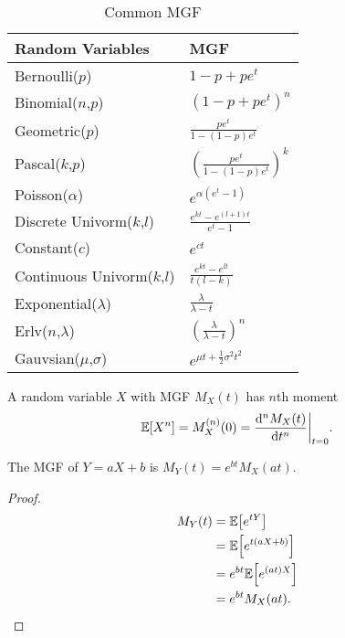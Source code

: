 \begin{table}[H]
    \centering
    \renewcommand{\arraystretch}{2}
    \begin{tabular}{|l|l|}
    \hline
    Random Variables            & MGF                                               \\ \hline
    Bernoulli($p$)              & $1-p+pe^t$                                 \\ \hline
    Binomial($n$,$p$)           & $(1-p+pe^t)^n$                             \\ \hline
    Geometric($p$)              & $\frac{pe^t}{1-(1-p)e^t}$                  \\ \hline
    Pascal($k$,$p$)             & $\left(\frac{pe^t}{1-(1-p)e^t}\right)^k$   \\ \hline
    Poisson($\alpha$)           & $e^{\alpha(e^t-1)}$                        \\ \hline
    Discrete Univorm($k$,$l$)   & $\frac{e^{kt}-e^{(l+1)t}}{e^t-1}$          \\ \hline
    Constant($c$)               & $e^{ct}$                                   \\ \hline
    Continuous Univorm($k$,$l$) & $\frac{e^{kt}-e^{lt}}{t(l-k)}$             \\ \hline
    Exponential($\lambda$)      & $\frac{\lambda}{\lambda-t}$                \\ \hline
    Erlv($n$,$\lambda$)       & $\left(\frac{\lambda}{\lambda-t}\right)^n$ \\ \hline
    Gauvsian($\mu$,$\sigma$)    & $e^{\mu t+\frac{1}{2}\sigma^2t^2}$         \\ \hline
    \end{tabular}
    \caption{Common MGF}
\end{table}

\begin{theorem}
    A random variable $X$ with \textnormal{MGF} $M_X(t)$ has $n$th moment
    \[\E{X^n}=M_X^{(n)}(0)=\frac{\diff^n M_X(t)}{\diff t^n}\bigg\rvert_{t=0}.\]
\end{theorem}

\begin{theorem}
    The \textnormal{MGF} of $Y=aX+b$ is $M_Y(t)=e^{bt}M_X(at)$.
\end{theorem}

\begin{proof}
    \begin{align*}
        M_Y(t)&=\E{e^{tY}}\\
        &=\E{e^{t(aX+b)}}\\
        &=e^{bt}\E{e^{(at)X}}\\
        &=e^{bt}M_X(at).
    \end{align*}
\end{proof}

